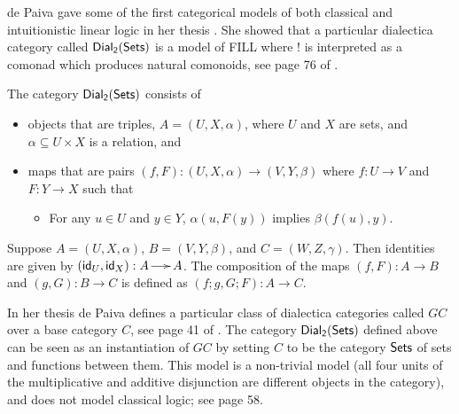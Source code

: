 de Paiva gave some of the first categorical models of both classical
and intuitionistic linear logic in her thesis \cite{dePaiva:1988}. She
showed that a particular dialectica category called $\mathsf{Dial_2}(\mathsf{Sets})$ is a model
of FILL where $!$ is interpreted as a comonad which produces natural
comonoids, see page 76 of \cite{dePaiva:1988}.
\begin{definition}
  \label{def:dial2sets}
  The category $\mathsf{Dial_2}(\mathsf{Sets})$ consists of 
  \begin{itemize}
  \item objects that are triples, $A = (U,X,\alpha)$, where $U$ and
    $X$ are sets, and $\alpha \subseteq U \times X$ is a relation, and
  \item maps that are pairs $(f,F) : (U,X,\alpha) \to (V,Y,\beta)$
    where $f : U \to V$ and $F : Y \to X$ such that
    \begin{itemize}
    \item For any $u \in U$ and $y \in Y$, $\alpha(u,F(y))$ implies $\beta(f(u),y)$.
    \end{itemize}
  \end{itemize}
  Suppose $A = (U,X,\alpha)$, $B = (V,Y,\beta)$, and
  $C = (W,Z,\gamma)$.  Then identities are given by
  $(\mathsf{id}_U,\mathsf{id}_X) : A \to A$.  The composition of the maps
  $(f,F) : A \to B$ and $(g, G) : B \to C$ is defined as
  $(f;g,G;F) : A \to C$.
\end{definition}
In her thesis de Paiva defines a particular class of dialectica
categories called $GC$ over a base category $C$, see page 41 of
\cite{dePaiva:1988}.  The category $\mathsf{Dial_2}(\mathsf{Sets})$ defined above can be seen
as an instantiation of $GC$ by setting $C$ to be the category $\mathsf{Sets}$
of sets and functions between them.  This model is a non-trivial model
(all four units of the multiplicative and additive disjunction are
different objects in the category), and does not model classical
logic; see \cite{dePaiva:1988} page 58.

